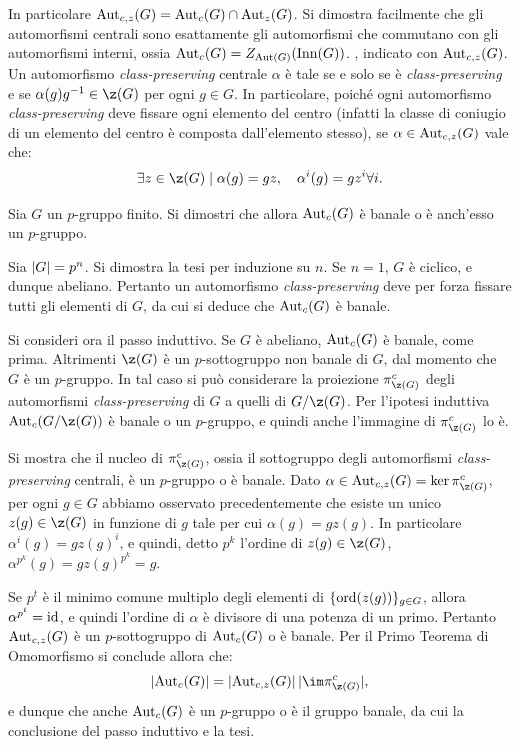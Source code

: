 \documentclass[11pt]{scrartcl}
\begin{document}
\begin{approf}
{			In
			particolare $\operatorname{Aut}_{c,z}(G) = \operatorname{Aut}_c(G) \cap \operatorname{Aut}_z(G)$. Si dimostra
			facilmente che gli automorfismi centrali sono esattamente gli
			automorfismi che commutano con gli automorfismi interni, ossia
			$\operatorname{Aut}_c(G) = Z_{\operatorname{Aut}(G)}(\operatorname{Inn}(G))$.
		}, indicato con $\operatorname{Aut}_{c,z}(G)$. Un
		automorfismo \textit{class-preserving} centrale $\alpha$ è tale se e solo se è
		\textit{class-preserving} e se
		$\alpha(g) g\inv \in \z(G)$ per ogni $g \in G$. In particolare,
		poiché ogni automorfismo \textit{class-preserving} deve fissare
		ogni elemento del centro (infatti la classe
		di coniugio di un elemento del centro è composta dall'elemento stesso),
		se $\alpha \in \operatorname{Aut}_{c,z}(G)$ vale che:
		\[ \exists z \in \z(G) \mid \alpha(g) = gz, \quad \alpha^i(g) = gz^i \forall i. \]
	\end{approf}
	
	\begin{exercise}[$\star$]
		Sia $G$ un $p$-gruppo finito. Si dimostri che allora $\operatorname{Aut}_c(G)$ è
		banale o è anch'esso un $p$-gruppo.
	\end{exercise}
	
	\begin{soln}
		Sia $\left\lvert G \right\rvert = p^n$. Si dimostra la tesi per induzione su $n$.
		Se $n = 1$, $G$ è ciclico, e dunque abeliano. Pertanto un automorfismo
		\textit{class-preserving} deve per forza fissare tutti gli elementi di
		$G$, da cui si deduce che $\operatorname{Aut}_c(G)$ è banale. \medskip
		
		
		Si consideri ora il passo induttivo. Se $G$ è abeliano, $\operatorname{Aut}_c(G)$ è
		banale, come prima. Altrimenti $\z(G)$ è un $p$-sottogruppo non banale di $G$,
		dal momento che $G$ è un $p$-gruppo. In tal caso si può considerare
		la proiezione $\pi_{\z(G)}^c$ degli automorfismi \textit{class-preserving}
		di $G$ a quelli di $G / \z(G)$. Per l'ipotesi induttiva $\Aut_c(G / \z(G))$
		è banale o un $p$-gruppo, e quindi anche l'immagine di $\pi_{\z(G)}^c$ lo
		è. \medskip
		
		
		Si mostra che il nucleo di $\pi_{\z(G)}^c$, ossia il sottogruppo degli
		automorfismi \textit{class-preserving} centrali, è un $p$-gruppo o è banale. Dato $\alpha \in \Aut_{c,z}(G) = \ker \pi_{\z(G)}^c$, per ogni $g \in G$ abbiamo
		osservato precedentemente che esiste un unico $z(g) \in \z(G)$ in funzione di $g$ tale per cui
		$\alpha(g) = gz(g)$. In particolare $\alpha^i(g) = gz(g)^i$, e quindi,
		detto $p^k$ l'ordine di $z(g) \in \z(G)$, $\alpha^{p^k}(g) = gz(g)^{p^k} = g$. \medskip
		
		
		Se $p^t$ è il minimo comune multiplo degli elementi di $\{\operatorname{ord}(z(g))\}_{g \in G}$, allora $\alpha^{p^t} = \mathrm{id}$, e
		quindi l'ordine di $\alpha$ è divisore di una potenza di un primo. Pertanto
		$\operatorname{Aut}_{c,z}(G)$ è un $p$-sottogruppo di $\operatorname{Aut}_c(G)$ o è banale. Per il Primo Teorema di
		Omomorfismo si conclude allora che:
		\[ \abs{\Aut_c(G)} = \abs{\Aut_{c,z}(G)} \lvert \im \pi_{\z(G)}^c \rvert, \]
		e dunque che anche $\operatorname{Aut}_c(G)$ è un $p$-gruppo o è il gruppo banale, da cui la conclusione del
		passo induttivo e la tesi.
	\end{soln}
	
\end{document}
